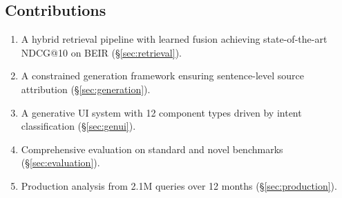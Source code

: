 \subsection{Contributions}

\begin{enumerate}[leftmargin=1.4em]
    \item A hybrid retrieval pipeline with learned fusion achieving state-of-the-art NDCG@10 on BEIR (\S\ref{sec:retrieval}).
    \item A constrained generation framework ensuring sentence-level source attribution (\S\ref{sec:generation}).
    \item A generative UI system with 12 component types driven by intent classification (\S\ref{sec:genui}).
    \item Comprehensive evaluation on standard and novel benchmarks (\S\ref{sec:evaluation}).
    \item Production analysis from 2.1M queries over 12 months (\S\ref{sec:production}).
\end{enumerate}

